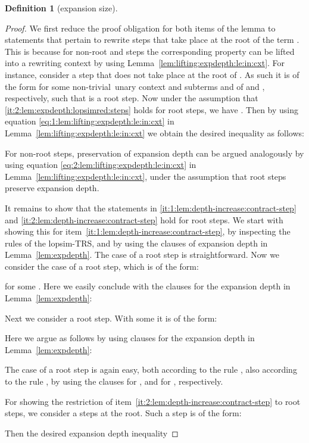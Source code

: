 \documentclass[
submission
]{dmtcs-episciences-tampered}
\newcommand{\lopsimTRS}{lopsim-TRS}
\newcommand{\nontrivial}{non-triv\-i\-al}
\theoremstyle{plain}
\theoremstyle{definition}
\newtheorem{definition}[theorem]{Definition}
\begin{document}
\begin{definition}[expansion size]
{\begin{proof}
  We first reduce the proof obligation for both items of the lemma
  to statements that pertain to rewrite steps that take place at the root of the term . 
  This is because for non-root  and  steps  
  the corresponding property can be lifted into a rewriting context by using Lemma~\ref{lem:lifting:expdepth:le:in:cxt}.
For instance, consider a step  that does not take place at the root of . 
  As such it is of the form 
  for some \nontrivial\ unary context  and subterms  and  of  and , respectively,
  such that  is a root step. 
  Now under the assumption that \eqref{it:2:lem:expdepth:lopsimred:steps} holds for root  steps,
  we have . 
  Then by using equation \eqref{eq:1:lem:lifting:expdepth:le:in:cxt} in Lemma~\ref{lem:lifting:expdepth:le:in:cxt}
  we obtain the desired inequality as follows:
  
  For non-root  steps, preservation of expansion depth can be argued analogously
  by using equation \eqref{eq:2:lem:lifting:expdepth:le:in:cxt} in Lemma~\ref{lem:lifting:expdepth:le:in:cxt},
  under the assumption that root   steps preserve expansion depth.


  It remains to show that the statements in \eqref{it:1:lem:depth-increase:contract-step} and \eqref{it:2:lem:depth-increase:contract-step} 
  hold for root steps. 
  We start with showing this for item~\eqref{it:1:lem:depth-increase:contract-step},
  by inspecting the rules of the \lopsimTRS,
  and by using the clauses of expansion depth in Lemma~\ref{lem:expdepth}.
  The case of a root  step is straightforward. 
  Now we consider the case of a root  step, which is of the form: 
  
  for some .
  Here we easily conclude with the clauses for the expansion depth in Lemma~\ref{lem:expdepth}: 
  
  Next we consider a root  step. With some  it is of the form:
  
  Here we argue as follows by using clauses for the expansion depth in Lemma~\ref{lem:expdepth}:
  
  The case of a root  step is again easy,
  both according to the rule ,
  also according to the rule ,
  by using the clauses for , and for , respectively. 
  
  For showing the restriction of item~\eqref{it:2:lem:depth-increase:contract-step}
  to root steps, we consider a  steps at the root.
  Such a step is of the form:
  
  Then the desired expansion depth inequality 
  

\end{proof}}
\end{definition}
\end{document}
